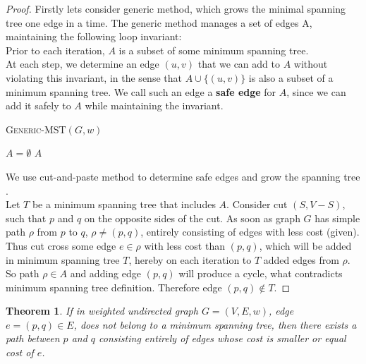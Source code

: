\documentclass{article}
\let\oldnl\nl
\newcommand{\nonl}{\renewcommand{\nl}{\let\nl\oldnl}}
\newtheorem{theorem}{Theorem}[section]
\begin{document}
\begin{proof}

Firstly lets consider generic method, which grows the minimal spanning tree
one edge in a time. 
The generic method manages a set of edges A, maintaining the
following loop invariant:\\

Prior to each iteration, $A$ is a subset of some minimum spanning tree.\\

At each step, we determine an edge $(u,v)$ that we can add to $A$ without violating
this invariant, in the sense that $A \cup \{(u,v)\}$ is also a subset of a minimum spanning
tree. 
We call such an edge a \textbf{safe edge} for $A$, since we can add it safely to $A$ while
maintaining the invariant.\\

\IncMargin{1em}
\begin{algorithm}[H]
  \SetAlgoNoEnd\SetAlgoNoLine
  \SetNlSkip{1.5em}
  \DontPrintSemicolon

  \nonl \textsc{Generic-MST}$(G,w)$

  $A = \emptyset$\;
  \Return $A$\;
\end{algorithm}

\vspace{1em}

We use cut-and-paste method to determine safe edges and grow the spanning tree
\cite[Theorem 23.1]{introtoalg}.\\

Let $T$ be a minimum spanning tree that includes $A$.
Consider cut $(S, V - S)$, such that $p$ and $q$ on the opposite
sides of the cut. As soon as graph $G$ has simple path $\rho$ from $p$ to $q$,
$\rho \neq (p,q)$, entirely consisting of edges with less cost (given).
Thus cut cross some edge $e \in \rho$ with less cost than $(p,q)$, which will be
added in minimum spanning tree $T$, hereby on each iteration to $T$ added edges
from $\rho$. So path $\rho \in A$ and adding edge $(p,q)$ will produce
a cycle, what contradicts minimum spanning tree definition. Therefore edge
$(p,q) \notin T$.
\end{proof}

\begin{theorem}
  If in weighted undirected graph $G=(V, E, w)$,
  edge $e=(p,q) \in E$, does not belong to a minimum spanning tree,
  then there exists a path between $p$ and $q$ consisting entirely
  of edges whose cost is smaller or equal cost of $e$.
\end{theorem}
\end{document}
